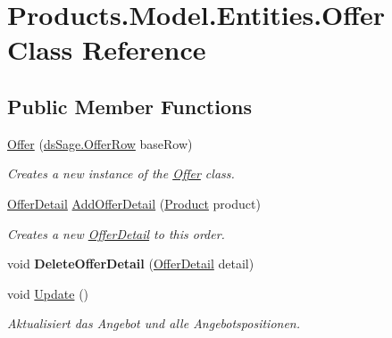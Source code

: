 \hypertarget{class_products_1_1_model_1_1_entities_1_1_offer}{}\section{Products.\+Model.\+Entities.\+Offer Class Reference}
\label{class_products_1_1_model_1_1_entities_1_1_offer}
\subsection*{Public Member Functions}
\begin{DoxyCompactItemize}
\item 
\hyperlink{class_products_1_1_model_1_1_entities_1_1_offer_a026291916ebfd766dd642c23dffa4dfb}{Offer} (\hyperlink{class_products_1_1_data_1_1ds_sage_1_1_offer_row}{ds\+Sage.\+Offer\+Row} base\+Row)
\begin{DoxyCompactList}\small\item\em Creates a new instance of the \hyperlink{class_products_1_1_model_1_1_entities_1_1_offer}{Offer} class. \end{DoxyCompactList}\item 
\hyperlink{class_products_1_1_model_1_1_entities_1_1_offer_detail}{Offer\+Detail} \hyperlink{class_products_1_1_model_1_1_entities_1_1_offer_a90050bfea68aa0594280fbf34c72abc9}{Add\+Offer\+Detail} (\hyperlink{class_products_1_1_model_1_1_entities_1_1_product}{Product} product)
\begin{DoxyCompactList}\small\item\em Creates a new \hyperlink{class_products_1_1_model_1_1_entities_1_1_offer_detail}{Offer\+Detail} to this order. \end{DoxyCompactList}\item 
void {\bfseries Delete\+Offer\+Detail} (\hyperlink{class_products_1_1_model_1_1_entities_1_1_offer_detail}{Offer\+Detail} detail)\hypertarget{class_products_1_1_model_1_1_entities_1_1_offer_a27b8dfc4a5ea36bdbf16d3db8e046c94}{}\label{class_products_1_1_model_1_1_entities_1_1_offer_a27b8dfc4a5ea36bdbf16d3db8e046c94}

\item 
void \hyperlink{class_products_1_1_model_1_1_entities_1_1_offer_ac517133c9232d7dabb09f461d5c81b8e}{Update} ()
\begin{DoxyCompactList}\small\item\em Aktualisiert das Angebot und alle Angebotspositionen. \end{DoxyCompactList}\end{DoxyCompactItemize}
